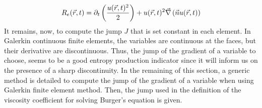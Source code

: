 %
\begin{equation}\label{eq:res_disc2_sct2}
R_e(\vec{r},t) = \partial_t \left( \frac{u(\vec{r},t)^2}{2} \right) +  u(\vec{r},t)^2 \vec{\nabla} \left( \vec{n} u(\vec{r},t) \right)
\end{equation}
%
It remains, now, to compute the jump $J$ that is set constant in each element. In Galerkin continuous finite elements, the variables are continuous at the faces, but their derivative are discontinuous. Thus, the jump of the gradient of a variable to choose, seems to be a good entropy production indicator since it will inform us on the presence of a sharp discontinuity. In the remaining of this section, a generic method is detailed to compute the jump of the gradient of a variable when using Galerkin finite element method. Then, the jump used in the definition of the viscosity coefficient for solving Burger's equation is given. 

